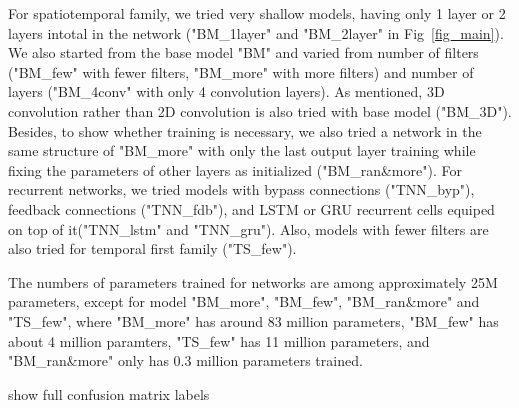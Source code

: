 For spatiotemporal family, we tried very shallow models, having only 1 layer or 2 layers intotal in the network ("BM\_1layer" and "BM\_2layer" in Fig~\ref{fig_main}). 
We also started from the base model "BM" and varied from number of filters ("BM\_few" with fewer filters, "BM\_more" with more filters) and number of layers ("BM\_4conv" with only 4 convolution layers).
As mentioned, 3D convolution rather than 2D convolution is also tried with base model ("BM\_3D").
Besides, to show whether training is necessary, we also tried a network in the same structure of "BM\_more" with only the last output layer training while fixing the parameters of other layers as initialized ("BM\_ran\&more").
For recurrent networks, we tried models with bypass connections ("TNN\_byp"), feedback connections ("TNN\_fdb"), and LSTM or GRU recurrent cells equiped on top of it("TNN\_lstm" and "TNN\_gru").
Also, models with fewer filters are also tried for temporal first family ("TS\_few").


The numbers of parameters trained for networks are among approximately 25M parameters, except for model "BM\_more", "BM\_few", "BM\_ran\&more" and "TS\_few", where "BM\_more" has around 83 million parameters, "BM\_few" has about 4 million paramters, "TS\_few" has 11 million parameters, and "BM\_ran\&more" only has 0.3 million parameters trained.



show full confusion matrix labels 


